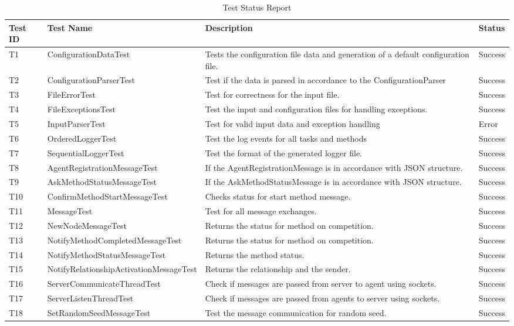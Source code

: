 \begin{enumerate}
\begin{itemize}
\begin{table}[H] 
\caption{Test Status Report} %
\begin{tabular}{| l | l | p{5cm} | l |} %
\hline\hline %
 Test ID & Test Name &  Description & Status \\ [0.5ex] %
\hline %
T1 & ConfigurationDataTest &  Tests the configuration file data and generation of a default configuration file. & Success \\ %
T2 &  ConfigurationParserTest & Test if the data is parsed in accordance to the ConfigurationParser &  Success \\ %
T3 & FileErrorTest & Test for correctness for the input file. &  Success \\ %
T4 & FileExceptionsTest & Test the input and configuration files for handling exceptions. &  Success \\
T5 & InputParserTest & Test for valid input data and exception handling &  Error \\
T6 & OrderedLoggerTest & Test the log events for all tasks and methods &  Success \\
T7 & SequentialLoggerTest & Test the format of the generated logger file. &  Success \\
T8 & AgentRegistrationMessageTest & If the AgentRegistrationMessage is in accordance with JSON structure. &  Success \\
T9 & AskMethodStatusMessageTest & If the AskMethodStatusMessage is in accordance with JSON structure. &  Success \\
T10 & ConfirmMethodStartMessageTest & Checks status for start method message. &  Success \\
T11 & MessageTest & Test for all message exchanges. &  Success \\
T12 & NewNodeMessageTest & Returns the status for method on competition. &  Success \\
T13 & NotifyMethodCompletedMessageTest & Returns the status for method on competition. &  Success \\
T14 & NotifyMethodStatusMessageTest & Returns the method status. &  Success \\
T15 & NotifyRelationshipActivationMessageTest & Returns the relationship and the sender. &  Success \\
T16 & ServerCommunicateThreadTest & Check if messages are passed from server to agent using sockets. &  Success \\
T17 & ServerListenThreadTest & Check if messages are passed from agents to server using sockets. &  Success \\
T18 & SetRandomSeedMessageTest & Test the message communication for random seed. &  Success \\
\hline %
\end{tabular} 
\label{table:nonlin} %
\end{table} 


\end{itemize}
\end{enumerate}
